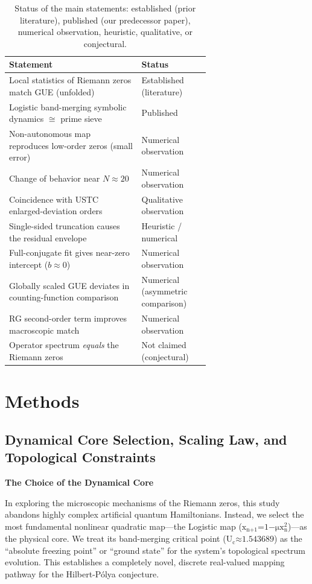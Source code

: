 \begin{table}[ht]
\centering
\begin{tabular}{p{0.66\linewidth}l}
\hline
Statement & Status \\
\hline
Local statistics of Riemann zeros match GUE (unfolded) & Established (literature) \\
Logistic band-merging symbolic dynamics $\cong$ prime sieve & Published \cite{wang2026} \\
Non-autonomous map reproduces low-order zeros (small error) & Numerical observation \\
Change of behavior near $N\approx20$ & Numerical observation \\
Coincidence with USTC enlarged-deviation orders & Qualitative observation \\
Single-sided truncation causes the residual envelope & Heuristic / numerical \\
Full-conjugate fit gives near-zero intercept ($b\approx0$) & Numerical observation \\
Globally scaled GUE deviates in counting-function comparison & Numerical (asymmetric comparison) \\
RG second-order term improves macroscopic match & Numerical observation \\
Operator spectrum \emph{equals} the Riemann zeros & Not claimed (conjectural) \\
\hline
\end{tabular}
\caption{\label{tab:claims}Status of the main statements: established (prior literature), published (our predecessor paper), numerical observation, heuristic, qualitative, or conjectural.}
\end{table}

\section*{Methods}

\subsection*{Dynamical Core Selection, Scaling Law, and Topological Constraints}

\textbf{The Choice of the Dynamical Core}

In exploring the microscopic mechanisms of the Riemann zeros, this study
abandons highly complex artificial quantum Hamiltonians. Instead, we
select the most fundamental nonlinear quadratic map---the Logistic map
(\(\text{x}_{\text{n}\text{+1}}\text{=1−}\text{μ}\text{x}_{\text{n}}^{\text{2}}\))---as
the physical core. We treat its band-merging critical point
(\(\text{U}_{\text{c}}\text{≈1.543689}\)) as the ``absolute freezing
point'' or ``ground state'' for the system's topological spectrum
evolution. This establishes a completely novel, discrete real-valued
mapping pathway for the Hilbert-Pólya conjecture.

